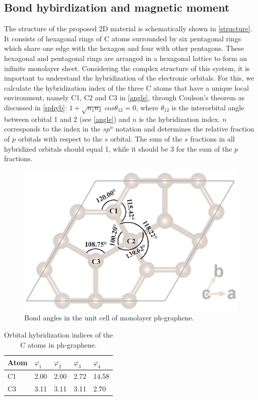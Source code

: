 \subsection{Bond hybirdization and magnetic moment \label{res}}

The structure of the proposed 2D material is schematically shown in \autoref{structure}. It consists of hexagonal rings of C atoms surrounded by six pentagonal rings which share one edge with the hexagon and four with other pentagons. These hexagonal and pentagonal rings are arranged in a hexagonal lattice to form an infinite monolayer sheet. Considering the complex structure of this system, it is important to understand the hybridization of the electronic orbitals. For this, we calculate the hybridization index of the three C atoms that have a unique local environment, namely C1, C2 and C3 in \autoref{angle}, through Coulson's theorem as discussed in \autoref{sphyb}: $1+\sqrt{n_1n_2}~cos\theta_{12}=0$, where $\theta_{12}$ is the interorbital angle between orbital 1 and 2 (see \autoref{angle}) and $n$ is the hybridization index.  $n$ corresponds to the index in the $sp^n$ notation and determines the relative fraction of $p$ orbitals with respect to the $s$ orbital. The sum of the $s$ fractions in all hybridized orbitals should equal 1, while it should be 3 for the sum of the $p$ fractions. 

\begin{figure}[htbp]
\centering
\includegraphics[width=0.6\linewidth]{PG_bond.eps}%
\caption{ Bond angles in the unit cell of monolayer ph-graphene. \label{angle}}
\end{figure}
  
\begin{table}[htbp]
\centering
\caption{Orbital hybridization indices of the C atoms in ph-graphene. \label{hybrid}}
\begin{tabularx}{0.5\linewidth}{XXXXX}
\hline\hline
Atom & $\varphi_1$ & $\varphi_2$ & $\varphi_3$ & $\varphi_4$  \\ \hline
C1 & 2.00 & 2.00 & 2.72 & 14.58 \\
C3 & 3.11 & 3.11 & 3.11 & 2.70 \\
\hline\hline
\end{tabularx}
\end{table}

